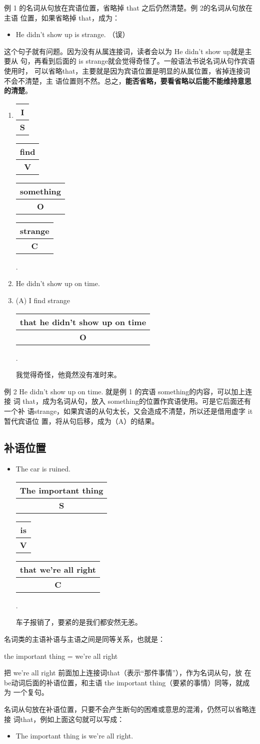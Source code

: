 \documentclass{yufa}
\makeatletter
\newcommand\unct[2]{\def\arraystretch{0.8}
  {\setlength{\tabcolsep}{0pt}
    \begin{tabular}[t]{@{}c@{}} \setlength\arrayrulewidth{0.8pt} \textbf{#1}\\\hline \textbf{\small #2} \\\end{tabular}}}
\newcommand\unbf[1]{\CJKunderline[thickness=0.8pt, textformat=\bfseries]{#1}}
\def\reitem{\refstepcounter{enumi}\item[\Rightarrow]}
\makeatother
\begin{document}
例 1 的名词从句放在宾语位置，省略掉 that 之后仍然清楚。例 2的名词从句放在主语
位置，如果省略掉 that，成为：
\begin{itemize}
\item He didn't show up is strange. （误）
\end{itemize}
这个句子就有问题。因为没有从属连接词，读者会以为 He didn't show up就是主要从
句，再看到后面的 is strange就会觉得奇怪了。一般语法书说名词从句作宾语使用时，
可以省略that，主要就是因为宾语位置是明显的从属位置，省掉连接词不会不清楚，主
语位置则不然。总之，\textbf{能否省略，要看省略以后能不能维持意思的清楚}。

\begin{enumerate}
\item \unct{I}{S} \unct{find}{V} \unct{something}{O} \unct{strange}{C}.
\item He didn't show up on time.
\reitem (A) I find \unbf{it} strange \unct{that he didn't show up on time}{O}.

我觉得奇怪，他竟然没有准时来。
\end{enumerate}
例 2 He didn't show up on time. 就是例 1 的宾语 something的内容，可以加上连接
词 that，成为名词从句，放入 something的位置作宾语使用。可是它后面还有一个补
语strange，如果宾语的从句太长，又会造成不清楚，所以还是借用虚字 it暂代宾语位
置，将从句后移，成为（A）的结果。

\subsection{补语位置}

\begin{itemize}
\item The car is ruined. \unct{The important thing}{S} \unct{is}{V} \unct{that we're all right}{C}.

  车子报销了，要紧的是我们都安然无恙。
\end{itemize}

名词类的主语补语与主语之间是同等关系，也就是：

the important thing = we're all right

把 we're all right 前面加上连接词that（表示“那件事情”），作为名词从句，放
在 be动词后面的补语位置，和主语 the important thing（要紧的事情）同等，就成为
一个复句。

名词从句放在补语位置，只要不会产生断句的困难或意思的混淆，仍然可以省略连接
词that，例如上面这句就可以写成：
\begin{itemize}
\item The important thing is we're all right.
\end{itemize}
\end{document}
